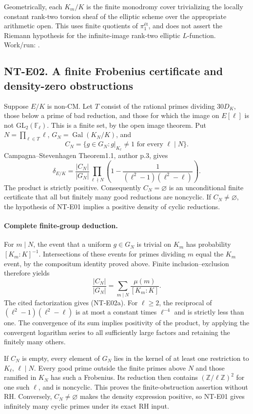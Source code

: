 \documentclass[11pt,a4paper]{article}
\begin{document}
Geometrically, each $K_m/K$ is the finite monodromy cover trivializing
the locally constant rank-two torsion sheaf of the elliptic scheme
over the appropriate arithmetic open. This uses finite quotients of
$\pi_1^{\text{ét}}$, and does not assert the Riemann hypothesis for
the infinite-image rank-two elliptic $L$-function. Work/run:
.

\subsection*{NT-E02. A finite Frobenius certificate and density-zero obstructions}
Suppose $E/K$ is non-CM. Let $T$ consist of the rational primes
dividing $30D_K$, those below a prime of bad reduction, and those for
which the image on $E[\ell]$ is not $\mathrm{GL}_2(\mathbb F_\ell)$.
This is a finite set, by the open image theorem. Put
$N=\prod_{\ell\in T}\ell$, $G_N=\operatorname{Gal}(K_N/K)$, and
\[
 C_N=\{g\in G_N:g|_{K_\ell}\ne1\text{ for every }\ell\mid N\}.
\]
Campagna--Stevenhagen Theorem1.1, author p.3, gives
\[
 \delta_{E/K}=\frac{|C_N|}{|G_N|}
   \prod_{\ell\nmid N}
       \left(1-\frac1{(\ell^2-1)(\ell^2-\ell)}\right).       \tag{NT-E02a}
\]
The product is strictly positive. Consequently $C_N=\varnothing$
is an unconditional finite certificate that all but finitely many
good reductions are noncyclic. If $C_N\ne\varnothing$, the hypothesis
of NT-E01 implies a positive density of cyclic reductions.

\paragraph{Complete finite-group deduction.}
For $m\mid N$, the event that a uniform $g\in G_N$ is trivial on
$K_m$ has probability $[K_m:K]^{-1}$. Intersections of these events
for primes dividing $m$ equal the $K_m$ event, by the compositum
identity proved above. Finite inclusion--exclusion therefore yields
\[
 \frac{|C_N|}{|G_N|}=\sum_{m\mid N}\frac{\mu(m)}{[K_m:K]}.
\]
The cited factorization gives (NT-E02a). For $\ell\ge2$, the
reciprocal of $(\ell^2-1)(\ell^2-\ell)$ is at most a constant
times $\ell^{-4}$ and is strictly less than one. The convergence
of its sum implies positivity of the product, by applying the
convergent logarithm series to all sufficiently large factors and
retaining the finitely many others.

If $C_N$ is empty, every element of $G_N$ lies in the kernel of at
least one restriction to $K_\ell$, $\ell\mid N$. Every good prime
outside the finite primes above $N$ and those ramified in $K_N$ has
such a Frobenius. Its reduction then contains
$(\mathbb Z/\ell\mathbb Z)^2$ for one such $\ell$, and is noncyclic.
This proves the finite-obstruction assertion without RH. Conversely,
$C_N\ne\varnothing$ makes the density expression positive, so NT-E01
gives infinitely many cyclic primes under its exact RH input.
\end{document}
